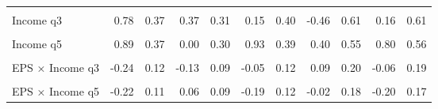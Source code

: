 \begin{table}
\begin{tabular}[t]{lrrrrrrrrrr}
\cellcolor{gray!10}{Income q2} & \cellcolor{gray!10}{0.08} & \cellcolor{gray!10}{0.38} & \cellcolor{gray!10}{-0.08} & \cellcolor{gray!10}{0.30} & \cellcolor{gray!10}{0.33} & \cellcolor{gray!10}{0.41} & \cellcolor{gray!10}{-0.46} & \cellcolor{gray!10}{0.61} & \cellcolor{gray!10}{-0.07} & \cellcolor{gray!10}{0.63}\\
Income q3 & 0.78 & 0.37 & 0.37 & 0.31 & 0.15 & 0.40 & -0.46 & 0.61 & 0.16 & 0.61\\
\cellcolor{gray!10}{Income q4} & \cellcolor{gray!10}{0.89} & \cellcolor{gray!10}{0.36} & \cellcolor{gray!10}{0.51} & \cellcolor{gray!10}{0.31} & \cellcolor{gray!10}{0.39} & \cellcolor{gray!10}{0.39} & \cellcolor{gray!10}{-0.30} & \cellcolor{gray!10}{0.58} & \cellcolor{gray!10}{-0.04} & \cellcolor{gray!10}{0.63}\\
Income q5 & 0.89 & 0.37 & 0.00 & 0.30 & 0.93 & 0.39 & 0.40 & 0.55 & 0.80 & 0.56\\
\cellcolor{gray!10}{EPS × Income q2} & \cellcolor{gray!10}{-0.03} & \cellcolor{gray!10}{0.12} & \cellcolor{gray!10}{0.03} & \cellcolor{gray!10}{0.09} & \cellcolor{gray!10}{-0.11} & \cellcolor{gray!10}{0.13} & \cellcolor{gray!10}{0.12} & \cellcolor{gray!10}{0.19} & \cellcolor{gray!10}{0.02} & \cellcolor{gray!10}{0.19}\\
EPS × Income q3 & -0.24 & 0.12 & -0.13 & 0.09 & -0.05 & 0.12 & 0.09 & 0.20 & -0.06 & 0.19\\
\cellcolor{gray!10}{EPS × Income q4} & \cellcolor{gray!10}{-0.24} & \cellcolor{gray!10}{0.11} & \cellcolor{gray!10}{-0.11} & \cellcolor{gray!10}{0.09} & \cellcolor{gray!10}{-0.05} & \cellcolor{gray!10}{0.12} & \cellcolor{gray!10}{0.18} & \cellcolor{gray!10}{0.18} & \cellcolor{gray!10}{0.03} & \cellcolor{gray!10}{0.19}\\
EPS × Income q5 & -0.22 & 0.11 & 0.06 & 0.09 & -0.19 & 0.12 & -0.02 & 0.18 & -0.20 & 0.17\\
\bottomrule
\end{tabular}
\end{table}
